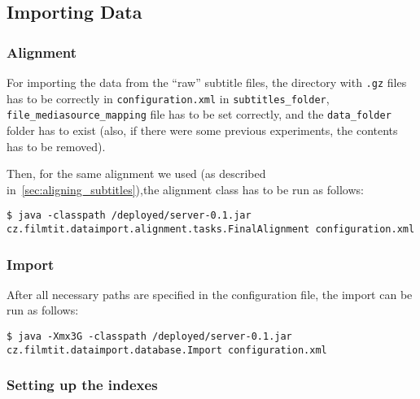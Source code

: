 \subsection{Importing Data}

\label{sec:import}

\subsubsection{Alignment}

For importing the data from the ``raw'' subtitle files, the directory with \texttt{.gz} files has to be correctly in \texttt{configuration.xml} in \texttt{subtitles\_folder}, \texttt{file\_mediasource\_mapping} file has to be set correctly, and the \texttt{data\_folder} folder has to exist (also, if there were some previous experiments, the contents has to be removed).

Then, for the same alignment we used (as described in~\ref{sec:aligning_subtitles}),the alignment class has to be run as follows:

\begin{lstlisting}
$ java -classpath /deployed/server-0.1.jar cz.filmtit.dataimport.alignment.tasks.FinalAlignment configuration.xml
\end{lstlisting}

\subsubsection{Import}

After all necessary paths are specified in the configuration file, the import can be run as follows:

\vspace*{0.5em}
\begin{lstlisting}
$ java -Xmx3G -classpath /deployed/server-0.1.jar cz.filmtit.dataimport.database.Import configuration.xml
\end{lstlisting}
\vspace*{0.5em}


\subsubsection{Setting up the indexes}

